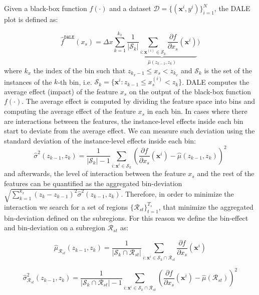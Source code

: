 \documentclass[12pt]{article}
\newcommand{\dfdx}{\frac{\partial f}{\partial x_s}}
\newcommand{\xb}{\mathbf{x}}
\begin{document}
Given a black-box function \(f(\cdot)\) and a dataset \(\mathcal{D} = \{(\xb^i, y^i)\}_{i=1}^N\),
the DALE plot is defined as:

\begin{equation}  \label{eq:DALE_accumulated_mean_est}
  \hat{f}^{\mathtt{DALE}}(x_s) = \Delta x \sum_{k=1}^{k_x} \underbrace{\frac{1}{|\mathcal{S}_k|} \sum_{i:\mathbf{x}^{(i)} \in
    \mathcal{S}_k} \dfdx(\mathbf{x}^i)}_{\hat{\mu}(z_{k-1}, z_k)})
\end{equation}
%
where \(k_x\) the index of the bin such that
\(z_{k_x-1} \leq x_s < z_{k_x} \) and \(\mathcal{S}_k\)
is the set of the instances of the \(k\)-th bin, i.e.
\( \mathcal{S}_k = \{ \xb^i : z_{k-1} \leq x^{(i)}_s < z_{k} \} \).
DALE computes the average effect (impact) of the feature \(x_s\) on the output of the black-box function \(f(\cdot)\).
The average effect is computed by dividing the feature space into bins and computing the average effect of
the feature \(x_s\) in each bin.
In cases where there are interactions between the features, the instance-level effects inside each bin
start to deviate from the average effect.
We can measure such deviation using the standard deviation of the instance-level effects inside each bin:
\begin{equation}
  \label{eq:var_bin_approx}
  \hat{\sigma}^2(z_{k-1}, z_k) = \frac{1}{|\mathcal{S}_k| - 1}
\sum_{i:\mathbf{x}^i \in \mathcal{S}_k} \left ( \dfdx(\mathbf{x}^i) -
  \hat{\mu}(z_{k-1}, z_k) \right )^2
\end{equation}
%
and afterwards, the level of interaction between the feature \(x_s\) and the rest of the features can be quantified
as the aggregated bin-deviation \(\sqrt{\sum_{k=1}^{k_x} (z_k - z_{k-1})^2 \hat{\sigma}^2(z_{k-1}, z_k)}\).
Therefore, in order to minimize the interaction we search for a set of regions \(\{\mathcal{R}_{st}\}_{t=1}^{T_s}\),
that minimize the aggregated bin-deviation defined on the subregions.
For this reason we define the bin-effect and bin-deviation on a subregion \(\mathcal{R}_{st}\) as:

\begin{equation}
    \label{eq:bin_effect_subregion}
    \hat{\mu}_{\mathcal{R}_{st}}(z_{k-1}, z_k) = \frac{1}{|\mathcal{S}_k \cap \mathcal{R}_{st}|} \sum_{i:\mathbf{x}^i \in \mathcal{S}_k \cap \mathcal{R}_{st} } \dfdx(\mathbf{x}^i)
\end{equation}


\begin{equation}
  \label{eq:bin_deviation_subregion}
  \hat{\sigma}_{\mathcal{R}_{st}}^2(z_{k-1}, z_k) = \frac{1}{|\mathcal{S}_k \cap \mathcal{R}_{st}| - 1}
\sum_{i:\mathbf{x}^i \in \mathcal{S}_k \cap \mathcal{R}_{st} } \left ( \dfdx(\mathbf{x}^i) -
    \hat{\mu}(\mathcal{R}_{st}) \right )^2
\end{equation}
\end{document}
